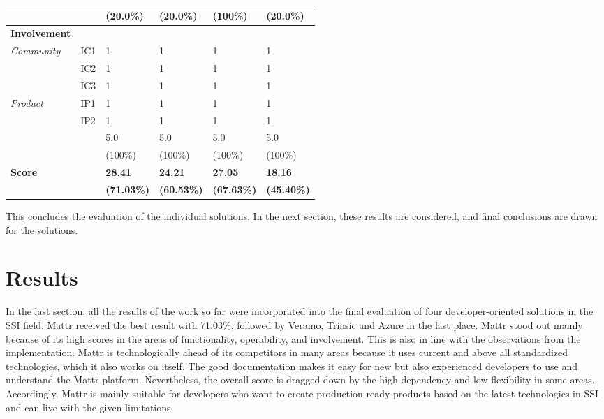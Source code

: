 \begin{longtable}{@{\extracolsep{\fill}}llllll@{}}
                               && (20.0\%) & (20.0\%) & (100\%) & (20.0\%) \\
                               \midrule
        \textbf{Involvement} &&&&&\\
        \textit{Community}     & IC1 & 1 & 1 & 1 & 1 \\
                               & IC2 & 1 & 1 & 1 & 1 \\                       
                               & IC3 & 1 & 1 & 1 & 1 \\                       
        \textit{Product}       & IP1 & 1 & 1 & 1 & 1 \\
                               & IP2 & 1 & 1 & 1 & 1 \\    
                               \hline
                               && 5.0 & 5.0 & 5.0 & 5.0 \\                        
                               && (100\%) & (100\%) & (100\%) & (100\%) \\
        \hline\hline
        \textbf{Score} & & \textbf{28.41} & \textbf{24.21} & \textbf{27.05} & \textbf{18.16} \\
        & & \textbf{(71.03\%)} & \textbf{(60.53\%)} & \textbf{(67.63\%)} & \textbf{(45.40\%)} \\
        \bottomrule
    \end{longtable}
    
    This concludes the evaluation of the individual solutions. In the next section, these results are considered, and final conclusions are drawn for the solutions.
    
	\section{Results}
	
    In the last section, all the results of the work so far were incorporated into the final evaluation of four developer-oriented solutions in the \ac{SSI} field. Mattr received the best result with 71.03\%, followed by Veramo, Trinsic and Azure in the last place. Mattr stood out mainly because of its high scores in the areas of functionality, operability, and involvement. This is also in line with the observations from the implementation. Mattr is technologically ahead of its competitors in many areas because it uses current and above all standardized technologies, which it also works on itself. The good documentation makes it easy for new but also experienced developers to use and understand the Mattr platform. Nevertheless, the overall score is dragged down by the high dependency and low flexibility in some areas. Accordingly, Mattr is mainly suitable for developers who want to create production-ready products based on the latest technologies in \ac{SSI} and can live with the given limitations.

